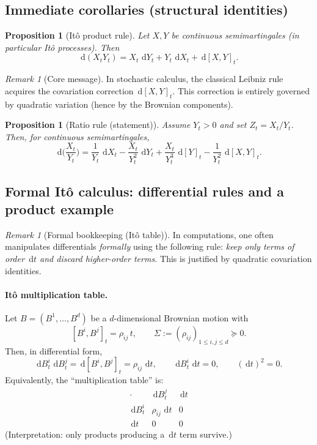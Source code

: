 \documentclass[11pt]{article}
\newcommand{\dd}{\,\mathrm{d}}
\newcommand{\1}{\mathbf{1}}
\theoremstyle{plain}
\newtheorem{proposition}[theorem]{Proposition}
\theoremstyle{definition}
\theoremstyle{remark}
\newtheorem{remark}[theorem]{Remark}
\begin{document}
\subsection{Immediate corollaries (structural identities)}

\begin{proposition}[It\^o product rule]\label{prop:product-rule}
Let $X,Y$ be continuous semimartingales (in particular It\^o processes). Then
\[
\dd(X_tY_t)=X_t\,\dd Y_t + Y_t\,\dd X_t + \dd[X,Y]_t.
\]
\end{proposition}

\begin{remark}[Core message]
In stochastic calculus, the classical Leibniz rule acquires the covariation correction $\dd[X,Y]_t$.
This correction is entirely governed by quadratic variation (hence by the Brownian components).
\end{remark}

\begin{proposition}[Ratio rule (statement)]
Assume $Y_t>0$ and set $Z_t=X_t/Y_t$. Then, for continuous semimartingales,
\[
\dd\Big(\frac{X_t}{Y_t}\Big)
=
\frac{1}{Y_t}\,\dd X_t
-\frac{X_t}{Y_t^2}\,\dd Y_t
+\frac{X_t}{Y_t^3}\,\dd[Y]_t
-\frac{1}{Y_t^2}\,\dd[X,Y]_t.
\]
\end{proposition}

\subsection{Formal It\^o calculus: differential rules and a product example}

\begin{remark}[Formal bookkeeping (It\^o table)]
In computations, one often manipulates differentials \emph{formally} using the following rule:
\emph{keep only terms of order $\dd t$ and discard higher-order terms.}
This is justified by quadratic covariation identities.
\end{remark}

\paragraph{It\^o multiplication table.}
Let $B=(B^1,\dots,B^d)$ be a $d$-dimensional Brownian motion with
\[
[B^i,B^j]_t = \rho_{ij}\,t,
\qquad \Sigma := (\rho_{ij})_{1\le i,j\le d}\succeq 0.
\]
Then, in differential form,
\[
\dd B_t^i\,\dd B_t^j = \dd[B^i,B^j]_t = \rho_{ij}\,\dd t,
\qquad
\dd B_t^i\,\dd t = 0,
\qquad
(\dd t)^2=0.
\]
Equivalently, the ``multiplication table'' is:
\[
\begin{array}{c|ccc}
\cdot & \dd B_t^j & \dd t \\ \hline
\dd B_t^i & \rho_{ij}\,\dd t & 0 \\
\dd t & 0 & 0
\end{array}
\]
(Interpretation: only products producing a $\dd t$ term survive.)
\end{document}
